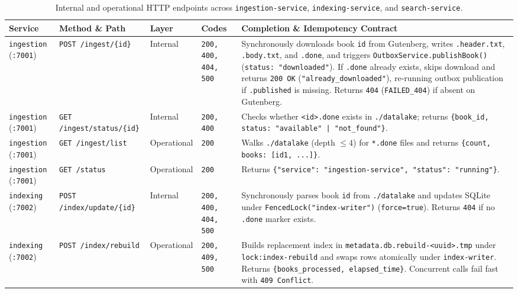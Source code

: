 \documentclass[10pt,a4paper]{article}
\begin{document}
\begin{table}[!htbp]
\centering
\caption{Internal and operational HTTP endpoints across \texttt{ingestion-service}, \texttt{indexing-service}, and \texttt{search-service}.}
\label{tab:internal_api}
\scriptsize
\setlength{\tabcolsep}{3.5pt}
\renewcommand{\arraystretch}{1.16}
\begin{tabularx}{\textwidth}{L{2.1cm} L{3.2cm} L{1.5cm} L{1.8cm} Y}
\toprule
\textbf{Service} & \textbf{Method \& Path} & \textbf{Layer} & \textbf{Codes} & \textbf{Completion \& Idempotency Contract} \\
\midrule
\texttt{ingestion} (\texttt{:7001}) & \texttt{POST /ingest/\{id\}} & Internal & \texttt{200, 400, 404, 500} & Synchronously downloads book \texttt{id} from Gutenberg, writes \texttt{.header.txt}, \texttt{.body.txt}, and \texttt{.done}, and triggers \texttt{OutboxService.publishBook()} (\texttt{status: "downloaded"}). If \texttt{.done} already exists, skips download and returns \texttt{200 OK} (\texttt{"already\_downloaded"}), re-running outbox publication if \texttt{.published} is missing. Returns \texttt{404} (\texttt{FAILED\_404}) if absent on Gutenberg. \\
\texttt{ingestion} (\texttt{:7001}) & \texttt{GET /ingest/status/\{id\}} & Internal & \texttt{200, 400} & Checks whether \texttt{<id>.done} exists in \texttt{./datalake}; returns \texttt{\{book\_id, status: "available" | "not\_found"\}}. \\
\texttt{ingestion} (\texttt{:7001}) & \texttt{GET /ingest/list} & Operational & \texttt{200} & Walks \texttt{./datalake} (depth $\le 4$) for \texttt{*.done} files and returns \texttt{\{count, books: [id1, ...]\}}. \\
\texttt{ingestion} (\texttt{:7001}) & \texttt{GET /status} & Operational & \texttt{200} & Returns \texttt{\{"service": "ingestion-service", "status": "running"\}}. \\
\midrule
\texttt{indexing} (\texttt{:7002}) & \texttt{POST /index/update/\{id\}} & Internal & \texttt{200, 400, 404, 500} & Synchronously parses book \texttt{id} from \texttt{./datalake} and updates SQLite under \texttt{FencedLock("index-writer")} (\texttt{force=true}). Returns \texttt{404} if no \texttt{.done} marker exists. \\
\texttt{indexing} (\texttt{:7002}) & \texttt{POST /index/rebuild} & Operational & \texttt{200, 409, 500} & Builds replacement index in \texttt{metadata.db.rebuild-<uuid>.tmp} under \texttt{lock:index-rebuild} and swaps rows atomically under \texttt{index-writer}. Returns \texttt{\{books\_processed, elapsed\_time\}}. Concurrent calls fail fast with \texttt{409 Conflict}. \\

\end{tabularx}
\end{table}
\end{document}
